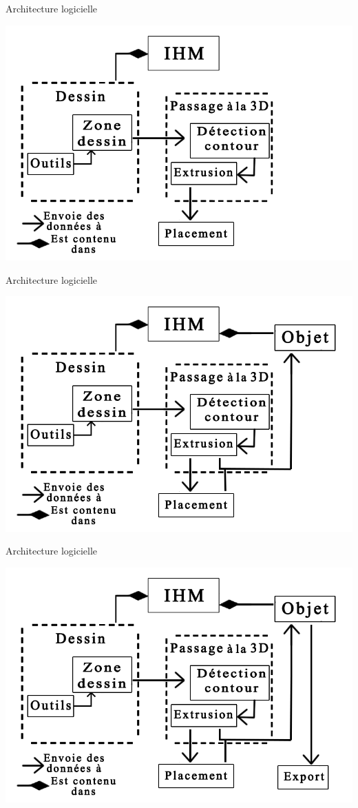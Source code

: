 \documentclass[a4paper,10pt]{beamer}
\begin{document}
	\begin{frame}{Architecture logicielle} %
		\centerline{\includegraphics[scale=0.3]{images/archilogi/archi4.png}}
	\end{frame}
	\begin{frame}{Architecture logicielle} %
		\centerline{\includegraphics[scale=0.3]{images/archilogi/archi5.png}}
	\end{frame}	
	\begin{frame}{Architecture logicielle} %
		\centerline{\includegraphics[scale=0.3]{images/archilogi/archi6.png}}
	\end{frame}
			
\end{document}
